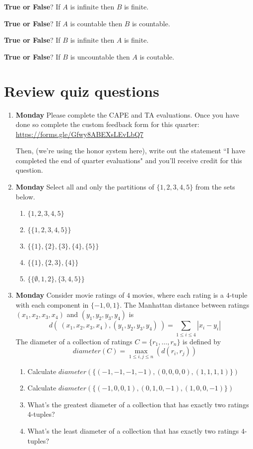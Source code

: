 \documentclass[12pt, oneside]{article}
\begin{document}
{\bf True or False}?  If $A$ is infinite then $B$ is finite.

\vfill

{\bf True or False}?  If $A$ is countable then $B$ is countable.

\vfill

{\bf True or False}?  If $B$ is infinite then $A$ is finite.

\vfill

{\bf True or False}?  If $B$ is uncountable then $A$ is coutable.

\vfill



\newpage
\section*{Review quiz questions}
\begin{enumerate}

\item {\bf Monday} Please complete the CAPE and TA evaluations.  Once 
you have done so complete the custom feedback form for this quarter: \url{https://forms.gle/Gfwy8ABEXsLEvLbQ7}

Then, (we're using the honor system here), write out the statement
``I have completed the end  of quarter evaluations"  and you'll receive credit for  this  question.

\item {\bf Monday} Select all and only the partitions of $\{1,2,3,4,5\}$ from the sets below.
\begin{enumerate}
\item $\{1,2,3,4,5\}$
\item $\{\{1,2,3,4,5\}\}$
\item $\{\{1\},\{2\},\{3\},\{4\},\{5\}\}$
\item $\{ \{1\}, \{2,3\}, \{4\} \}$
\item $\{ \{\emptyset, 1, 2\}, \{3,4,5\}\}$
\end{enumerate}

\item {\bf Monday} Consider movie ratings of $4$ movies, 
where each rating is a $4$-tuple with each component in $\{-1,0,1\}$. The Manhattan distance between
ratings $(x_1, x_2, x_3, x_4)$ and $(y_1, y_2, y_3, y_4)$ is 
\[
d(~(x_1, x_2, x_3, x_4), (y_1, y_2, y_3, y_4)~) = \sum_{1 \leq i \leq 4} |x_i - y_i|
\]
The diameter of a collection of ratings $C = \{r_1, \ldots, r_n\}$ is defined by 
\[
diameter(C) = \max_{1 \leq i, j \leq n} ( d(r_i, r_j))
\]
\begin{enumerate}
\item Calculate $diameter( \{ (-1,-1,-1,-1), (0,0,0,0), (1,1,1,1) \} )$
\item Calculate $diameter( \{ (-1,0,0,1), (0,1,0,-1), (1,0,0,-1) \} )$
\item What's the greatest diameter of a collection that has exactly two ratings $4$-tuples?
\item What's the least diameter of a collection that has exactly two ratings $4$-tuples?
\end{enumerate}


\end{enumerate}
\end{document}
